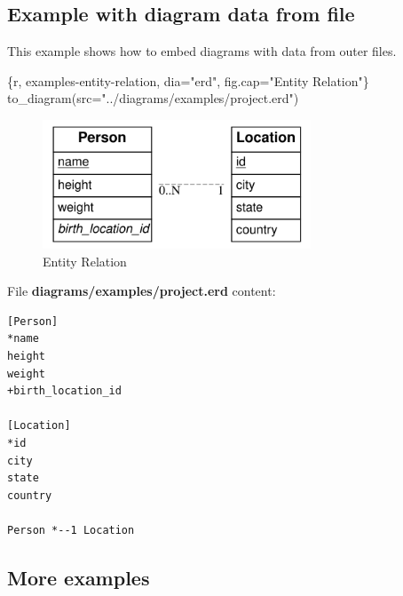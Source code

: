 \documentclass[
  12pt,
  a4paper,
  12pt,
  oneside,
  openany]{book}
\newenvironment{Shaded}{\begin{snugshade}}{\end{snugshade}}
\newcommand{\DataTypeTok}[1]{\textcolor[rgb]{0.27,0.27,0.27}{#1}}
\newcommand{\StringTok}[1]{\textcolor[rgb]{0.5,0.5,0.5}{#1}}
\begin{document}
\newpage

\hypertarget{examples-fromFile}{%
\subsection*{Example with diagram data from file}\label{examples-fromFile}}


This example shows how to embed diagrams with data from outer files.

\small

\begin{Shaded}
\begin{Highlighting}[]
\StringTok{\textasciigrave{}\textasciigrave{}\textasciigrave{}}\DataTypeTok{\{r, examples{-}entity{-}relation, dia="erd", fig.cap="Entity Relation"\}}
\DataTypeTok{  to\_diagram(src="../diagrams/examples/project.erd")}
\StringTok{\textasciigrave{}\textasciigrave{}\textasciigrave{}}
\end{Highlighting}
\end{Shaded}

\normalsize

\begin{figure}

{\centering \includegraphics[width=8cm]{generated/diagrams-examples-project-erd} 

}

\caption{Entity Relation}\label{fig:examples-entity-relation}
\end{figure}

\newpage

File \textbf{diagrams/examples/project.erd} content:

\begin{verbatim}
[Person]
*name
height
weight
+birth_location_id

[Location]
*id
city
state
country

Person *--1 Location
\end{verbatim}

\hypertarget{examples-more}{%
\subsection*{More examples}\label{examples-more}}
\end{document}
